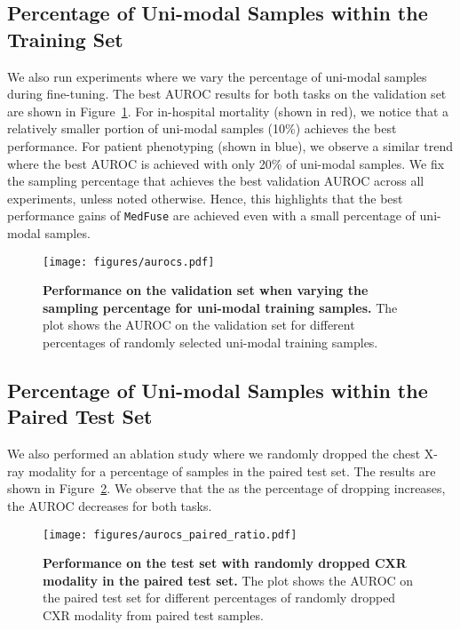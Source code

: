 \documentclass[pmlr]{jmlr}
\begin{document}
 
 
\subsection{Percentage of Uni-modal Samples within the Training Set} \label{unimodalpercentagetraining}
We also run experiments where we vary the percentage of uni-modal samples during fine-tuning. The best AUROC results for both tasks on the validation set are shown in Figure~\ref{fig:data_ratio}. For in-hospital mortality (shown in red), we notice that a relatively smaller portion of uni-modal samples (10\%) achieves the best performance. For patient phenotyping (shown in blue), we observe a similar trend where the best AUROC is achieved with only 20\% of uni-modal samples. We fix the sampling percentage that achieves the best validation AUROC across all experiments, unless noted otherwise. Hence, this highlights that the best performance gains of \texttt{MedFuse} are achieved even with a small percentage of uni-modal samples.


\begin{figure}[h!]
    \centering
    \vspace{-1mm}
    \texttt{[image: figures/aurocs.pdf]}
    \vspace{-3mm}
    \caption{\small\textbf{Performance on the validation set when varying the sampling percentage for uni-modal training samples.} The plot shows the AUROC on the validation set for different percentages of randomly selected uni-modal training samples. }\label{fig:data_ratio}
    \vspace{-4mm}
\end{figure}


\subsection{Percentage of Uni-modal Samples within the Paired Test Set}
\label{unimodalpercPAIRED}
We also performed an ablation study where we randomly dropped the chest X-ray modality for a percentage of samples in the paired test set. The results are shown in Figure~\ref{fig:data_ratio_paired}. We observe that the as the percentage of dropping increases, the AUROC decreases for both tasks. 


\begin{figure}[h!]
    \centering
    \vspace{-1mm}
    \texttt{[image: figures/aurocs\_paired\_ratio.pdf]}
    \vspace{-3mm}
    \caption{\small\textbf{Performance on the test set with randomly dropped CXR modality in the paired test set.} The plot shows the AUROC on the paired test set for different percentages of randomly dropped CXR modality from paired test samples.}
         \label{fig:data_ratio_paired}
    \vspace{-4mm}
\end{figure}
\end{document}
